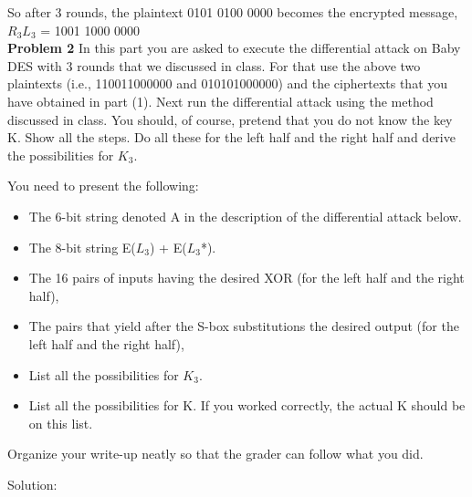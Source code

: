 \documentclass[12pt,letterpaper,final]{report}
\begin{document}
So after 3 rounds, the plaintext 0101 0100 0000 becomes the encrypted message, $R_3L_3$ = 1001 1000 0000 \\


\bigskip\noindent\textbf{Problem 2} In this part you are asked to execute the differential attack on Baby DES with 3 rounds that we discussed in class. For that use the above two plaintexts  (i.e., 110011000000 and 010101000000) and the ciphertexts that you have obtained in part (1).  Next run the differential attack using the method discussed in class.  You should, of course, pretend that you do not know the key K.  Show all the steps.  Do all these for the left half and the right half and derive the possibilities for $K_3$. 
\bigskip

You need to present the following:

\begin{itemize}
	\item The 6-bit string denoted A in the description of the differential attack below.
	\item The 8-bit string E($L_3$) + E($L_3$*). 
	\item The 16 pairs of inputs having the desired XOR (for the left half and the right half), 
	\item The pairs that yield after the S-box substitutions the desired output (for the left half and the right half),
	\item List all the possibilities for $K_3$.
	\item List all the possibilities for K. If you worked correctly, the actual K should be on this list.
\end{itemize}

Organize your write-up neatly so that the grader can follow what you did.


\bigskip Solution: 
\end{document}
